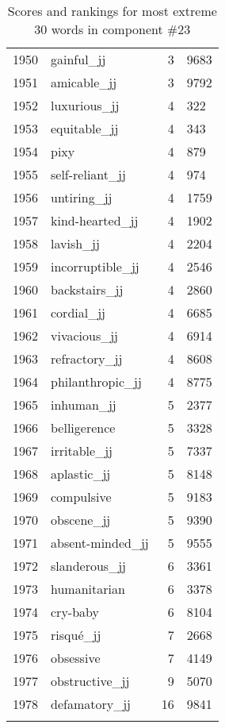 \begin{longtable}[!htbp]{| rlr@{.}l |}
    1950 & gainful\_jj & 3 & 9683 \\
    1951 & amicable\_jj & 3 & 9792 \\
    1952 & luxurious\_jj & 4 & 322 \\
    1953 & equitable\_jj & 4 & 343 \\
    1954 & pixy & 4 & 879 \\
    1955 & self-reliant\_jj & 4 & 974 \\
    1956 & untiring\_jj & 4 & 1759 \\
    1957 & kind-hearted\_jj & 4 & 1902 \\
    1958 & lavish\_jj & 4 & 2204 \\
    1959 & incorruptible\_jj & 4 & 2546 \\
    1960 & backstairs\_jj & 4 & 2860 \\
    1961 & cordial\_jj & 4 & 6685 \\
    1962 & vivacious\_jj & 4 & 6914 \\
    1963 & refractory\_jj & 4 & 8608 \\
    1964 & philanthropic\_jj & 4 & 8775 \\
    1965 & inhuman\_jj & 5 & 2377 \\
    1966 & belligerence & 5 & 3328 \\
    1967 & irritable\_jj & 5 & 7337 \\
    1968 & aplastic\_jj & 5 & 8148 \\
    1969 & compulsive & 5 & 9183 \\
    1970 & obscene\_jj & 5 & 9390 \\
    1971 & absent-minded\_jj & 5 & 9555 \\
    1972 & slanderous\_jj & 6 & 3361 \\
    1973 & humanitarian & 6 & 3378 \\
    1974 & cry-baby & 6 & 8104 \\
    1975 & risqué\_jj & 7 & 2668 \\
    1976 & obsessive & 7 & 4149 \\
    1977 & obstructive\_jj & 9 & 5070 \\
    1978 & defamatory\_jj & 16 & 9841 \\
    \hline
    \caption{Scores and rankings for most extreme 30 words in component \#23} \\
\end{longtable}
